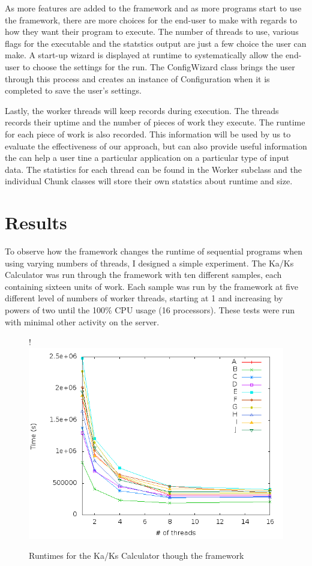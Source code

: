 \documentclass[12pt]{article}
\begin{document}
As more features are added to the framework and as more programs start to use 
the framework, there are more choices for the end-user to make with regards to 
how they want their program to execute. The number of threads to use, various 
flags for the executable and the statstics output are just a few choice the 
user can make. A start-up wizard is displayed at runtime to systematically allow
the end-user to choose the settings for the run. The ConfigWizard class brings 
the user through this process and creates an instance of Configuration when it 
is completed to save the user's settings.

Lastly, the worker threads will keep records during execution. The threads 
records their uptime and the number of pieces of work they execute. The runtime 
for each piece of work is also recorded. This information will be used by us to
evaluate the effectiveness of our approach, but can also provide useful
information the can help a user tine a particular application on a particular
type of input data. The statistics for each thread can be found in the Worker 
subclass and the individual Chunk classes will store their own statstics about 
runtime and size.

\section{Results}

To observe how the framework changes the runtime of sequential programs when
using varying numbers of threads, I designed a simple experiment. The Ka/Ks 
Calculator was run through the framework with ten different samples, each 
containing sixteen units of work. Each sample was run by the framework at five 
different level of numbers of worker threads, starting at 1 and increasing by 
powers of two until the 100\% CPU usage (16 processors). These tests were run
with minimal other activity on the server.

\begin{figure}
{{!}{\includegraphics{experiment/out.png}}}
\caption{Runtimes for the Ka/Ks Calculator though the framework}
\label{fig:graph}
\end{figure}
\end{document}
